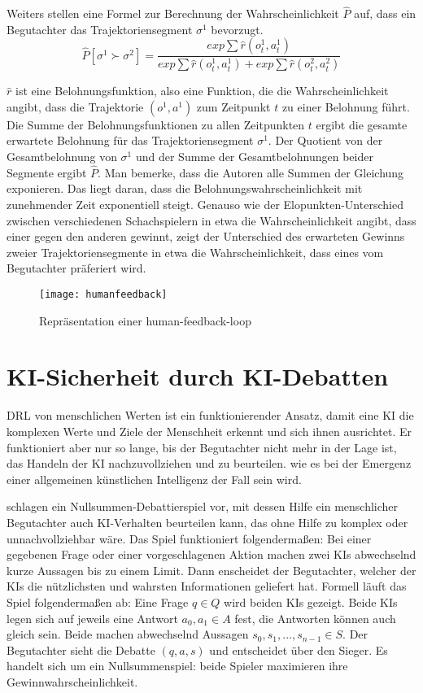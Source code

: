 Weiters stellen \citeauthor{christiano_deep_2017} eine Formel zur Berechnung der Wahrscheinlichkeit $\hat{P}$ auf, dass ein Begutachter das Trajektoriensegment $\sigma^1$ bevorzugt.
\begin{equation}
  \hat{P}[\sigma^1 \succ \sigma^2] = \frac{exp \sum \hat{r} (o_t^1,a_t^1)}{exp \sum \hat{r}(o^1_t,a^1_t) + exp \sum \hat{r}(o^2_t, a^2_t)}
\end{equation}

$\hat{r}$ ist eine Belohnungsfunktion, also eine Funktion, die die Wahrscheinlichkeit angibt, dass die Trajektorie $(o^1,a^1)$ zum Zeitpunkt $t$ zu einer Belohnung führt. Die Summe der Belohnungsfunktionen zu allen Zeitpunkten $t$ ergibt die gesamte erwartete Belohnung für das Trajektoriensegment $\sigma^1$. Der Quotient von der Gesamtbelohnung von $\sigma^1$ und der Summe der Gesamtbelohnungen beider Segmente ergibt $\hat{P}$. Man bemerke, dass die Autoren alle Summen der Gleichung exponieren. Das liegt daran, dass die Belohnungswahrscheinlichkeit mit zunehmender Zeit exponentiell steigt. Genauso wie der Elopunkten-Unterschied zwischen verschiedenen Schachspielern in etwa die Wahrscheinlichkeit angibt, dass einer gegen den anderen gewinnt, zeigt der Unterschied des erwarteten Gewinns zweier Trajektoriensegmente in etwa die Wahrscheinlichkeit, dass eines vom Begutachter präferiert wird.

\begin{figure}
  \texttt{[image: humanfeedback]}
  \caption{Repräsentation einer human-feedback-loop }
  \label{humanfeedbackimg}
\end{figure}

\section{KI-Sicherheit durch KI-Debatten}
DRL von menschlichen Werten ist ein funktionierender Ansatz, damit eine KI die komplexen Werte und Ziele der Menschheit erkennt und sich ihnen ausrichtet. Er funktioniert aber nur so lange, bis der Begutachter nicht mehr in der Lage ist, das Handeln der KI nachzuvollziehen und zu beurteilen. wie es bei der Emergenz einer allgemeinen künstlichen Intelligenz der Fall sein wird.

\citeauthor{irving_ai_2018} schlagen ein Nullsummen-Debattierspiel vor, mit dessen Hilfe ein menschlicher Begutachter auch KI-Verhalten beurteilen kann, das ohne Hilfe zu komplex oder unnachvollziehbar wäre. Das Spiel funktioniert folgendermaßen: Bei einer gegebenen Frage oder einer vorgeschlagenen Aktion machen zwei KIs abwechselnd kurze Aussagen bis zu einem Limit. Dann enscheidet der Begutachter, welcher der KIs die nützlichsten und wahrsten Informationen geliefert hat. Formell läuft das Spiel folgendermaßen ab: Eine Frage $q \in Q$ wird beiden KIs gezeigt. Beide KIs legen sich auf jeweils eine Antwort $a_0, a_1 \in A$ fest, die Antworten können auch gleich sein. Beide machen abwechselnd Aussagen $s_0, s_1,..., s_{n-1} \in S$. Der Begutachter sieht die Debatte $(q,a,s)$ und entscheidet über den Sieger. Es handelt sich um ein Nullsummenspiel: beide Spieler maximieren ihre Gewinnwahrscheinlichkeit.

